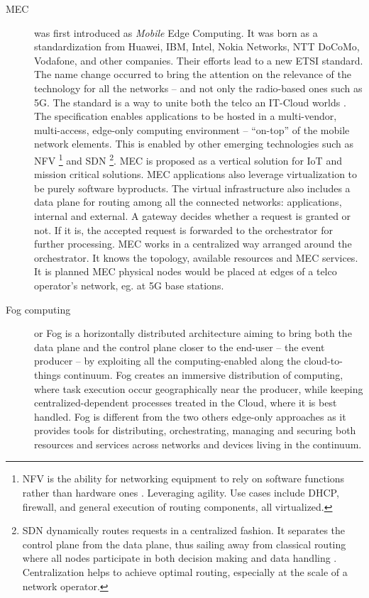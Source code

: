 \documentclass[11pt]{sdm}
\begin{document}
\begin{description}
	\item[\acrfull{MEC}] was first introduced as \emph{Mobile} Edge Computing. It was born as a standardization from Huawei, IBM, Intel, Nokia Networks, NTT DoCoMo, Vodafone, and other companies. Their efforts lead to a new \gls{ETSI} standard. The name change occurred to bring the attention on the relevance of the technology for all the networks -- and not only the radio-based ones such as 5G. The standard is a way to unite both the telco an IT-Cloud worlds \cite{dahmen-lhuissier_etsi_nodate-1}. The specification enables applications to be hosted in a multi-vendor, multi-access, edge-only computing environment -- ``on-top'' of the mobile network elements. This is enabled by other emerging technologies such as \gls{NFV} \footnote{\acrfull{NFV} is the ability for networking equipment to rely on software functions rather than hardware ones \cite{redhat_what_2019}. Leveraging agility. Use cases include DHCP, firewall, and general execution of routing components, all virtualized.} and \gls{SDN} \footnote{\acrfull{SDN} dynamically routes requests in a centralized fashion. It separates the control plane from the data plane, thus sailing away from classical routing where all nodes participate in both decision making and data handling \cite{redhat_what_2019}. Centralization helps to achieve optimal routing, especially at the scale of a network operator.}. \gls{MEC} is proposed as a vertical solution for \gls{IoT} and mission critical solutions. \gls{MEC} applications also leverage virtualization to be purely software byproducts. The virtual infrastructure also includes a data plane for routing among all the connected networks: applications, internal and external. A gateway decides whether a request is granted or not. If it is, the accepted request is forwarded to the orchestrator for further processing. \gls{MEC} works in a centralized way arranged around the orchestrator. It knows the topology, available resources and \gls{MEC} services. It is planned \gls{MEC} physical nodes would be placed at edges of a telco operator's network, eg. at 5G base stations.
	
	\item[Fog computing] or Fog is a horizontally distributed architecture aiming to bring both the data plane and the control plane closer to the end-user -- the event producer -- by exploiting all the computing-enabled along the cloud-to-things continuum. Fog creates an immersive distribution of computing, where task execution occur geographically near the producer, while keeping centralized-dependent processes treated in the Cloud, where it is best handled. Fog is different from the two others edge-only approaches as it provides tools for distributing, orchestrating, managing and securing both resources and services across networks and devices living in the continuum.
	

\end{description}
\end{document}
